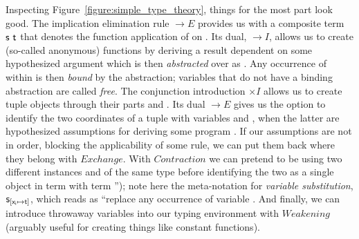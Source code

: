 Inspecting Figure~\ref{figure:simple_type_theory}, things for the most part look good.
The implication elimination rule $\to E$ provides us with a composite term $\mathsf{s~t}$ that denotes the function application of  on .
Its dual, $\to I$, allows us to create (so-called anonymous) functions by deriving a result  dependent on some hypothesized argument  which is then \textit{abstracted} over as .
Any occurrence of  within  is then \textit{bound} by the abstraction; variables that do not have a binding abstraction are called \textit{free}.
The conjunction introduction $\times I$ allows us to create tuple objects  through their parts  and .
Its dual $\to E$ gives us the option to identify the two coordinates of a tuple  with variables  and , when the latter are hypothesized assumptions for deriving some program .
If our assumptions are not in order, blocking the applicability of some rule, we can put them back where they belong with $Exchange$.
With $Contraction$ we can pretend to be using two different instances  and  of the same type before identifying the two as a single object  in term  with term '');
note here the meta-notation for \textit{variable substitution}, $\mathsf{s}_{[\mathsf{x_i} \mapsto \mathsf{t}]}$, which reads as ``replace any occurrence of variable .
And finally, we can introduce throwaway variables into our typing environment with $Weakening$ (arguably useful for creating things like constant functions).

